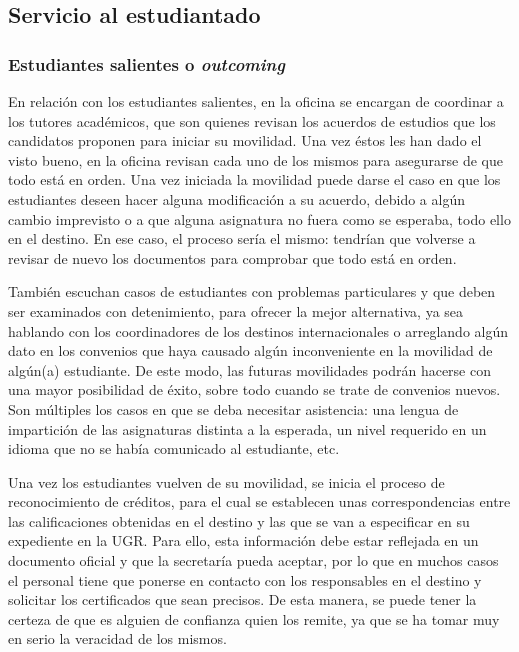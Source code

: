 \subsection{Servicio al estudiantado}
\subsubsection{Estudiantes salientes o \textit{outcoming}}

En relación con los estudiantes salientes, en la oficina se encargan de coordinar a los tutores académicos, que son quienes revisan los acuerdos de estudios que los candidatos proponen para iniciar su movilidad. Una vez éstos les han dado el visto bueno, en la oficina revisan cada uno de los mismos para asegurarse de que todo está en orden. Una vez iniciada la movilidad puede darse el caso en que los estudiantes deseen hacer alguna modificación a su acuerdo, debido a algún cambio imprevisto o a que alguna asignatura no fuera como se esperaba, todo ello en el destino. En ese caso, el proceso sería el mismo: tendrían que volverse a revisar de nuevo los documentos para comprobar que todo está en orden.

También escuchan casos de estudiantes con problemas particulares y que deben ser examinados con detenimiento, para ofrecer la mejor alternativa, ya sea hablando con los coordinadores de los destinos internacionales o arreglando algún dato en los convenios que haya causado algún inconveniente en la movilidad de algún(a) estudiante. De este modo, las futuras movilidades podrán hacerse con una mayor posibilidad de éxito, sobre todo cuando se trate de convenios nuevos. Son múltiples los casos en que se deba necesitar asistencia: una lengua de impartición de las asignaturas distinta a la esperada, un nivel requerido en un idioma que no se había comunicado al estudiante, etc.

Una vez los estudiantes vuelven de su movilidad, se inicia el proceso de reconocimiento de créditos, para el cual se establecen unas correspondencias entre las calificaciones obtenidas en el destino y las que se van a especificar en su expediente en la UGR. Para ello, esta información debe estar reflejada en un documento oficial y que la secretaría pueda aceptar, por lo que en muchos casos el personal tiene que ponerse en contacto con los responsables en el destino y solicitar los certificados que sean precisos. De esta manera, se puede tener la certeza de que es alguien de confianza quien los remite, ya que se ha tomar muy en serio la veracidad de los mismos.

